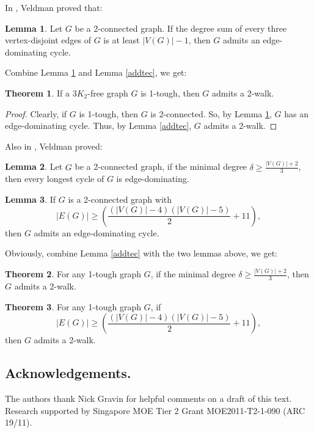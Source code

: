 \documentclass{amsart}
\theoremstyle{definition}
\newtheorem{theorem}{Theorem}
\newtheorem{lemma}{Lemma}
\begin{document}
In \cite{veldman83}, Veldman proved that:
\begin{lemma}\label{gen3k2de}{\cite[Corollary 3.2]{veldman83}}
Let $G$ be a 2-connected graph. If the degree sum of every three vertex-disjoint edges of $G$ is at least $|V(G)|-1$, then $G$ admits an edge-dominating cycle.
\end{lemma}

Combine Lemma \ref{gen3k2de} and Lemma \ref{addtec}, we get:

\begin{theorem}\label{2w3k2f}
If a $3K_2$-free graph $G$ is 1-tough, then $G$ admits a 2-walk.
\end{theorem}

\begin{proof}
Clearly, if $G$ is 1-tough, then $G$ is 2-connected. So, by Lemma \ref{gen3k2de}, $G$ has an edge-dominating cycle. Thus, by Lemma \ref{addtec}, $G$ admits a 2-walk.
\end{proof}

Also in \cite{veldman83}, Veldman proved:

\begin{lemma}\label{lemdelta}{\cite[Theorem C]{veldman83}}
Let $G$ be a 2-connected graph, if the minimal degree $\delta\ge\frac{|V(G)|+2}{3}$, then every longest cycle of $G$ is edge-dominating.
\end{lemma}

\begin{lemma}\label{2conxiaoe}{\cite[Corollary 3.3.1]{veldman83}}
If $G$ is a 2-connected graph with $$|E(G)|\ge(\frac{(|V(G)|-4)(|V(G)|-5)}{2}+11),$$ then $G$ admits an edge-dominating cycle.
\end{lemma}

Obviously, combine Lemma \ref{addtec} with the two lemmas above, we get:

\begin{theorem}\label{mdeg2w}
For any 1-tough graph $G$, if the minimal degree $\delta\ge\frac{|V(G)|+2}{3}$, then $G$ admits a 2-walk.
\end{theorem}


\begin{theorem}
For any 1-tough graph $G$, if $$|E(G)|\ge(\frac{(|V(G)|-4)(|V(G)|-5)}{2}+11),$$ then $G$ admits a 2-walk.
\end{theorem}



















\subsection*{Acknowledgements.}
The authors thank Nick Gravin
for helpful comments on a draft of this text.
Research supported by Singapore MOE Tier 2 Grant MOE2011-T2-1-090 (ARC 19/11). 



%
\end{document}
